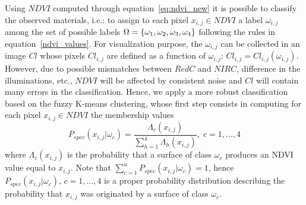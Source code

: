 \documentclass[letterpaper, 10pt, conference]{ieeeconf}      %
\begin{document}
Using $NDVI$ computed through equation~\eqref{eq:ndvi_new} it is possible to classify the observed materials, i.e.: to assign to each pixel $x_{i,j} \in NDVI$ a label $\omega_{i,j}$ among the set of possible labels $\Omega=\{\rm{\omega_1, \omega_2, \omega_3, \omega_4}\}$ following the rules in equation~\eqref{ndvi_values}.
For visualization purpose, the $\omega_{i,j}$ can be collected in an image $Cl$ whose pixels $Cl_{i,j}$ are defined as a function of $\omega_{i,j}$: $Cl_{i,j}=Cl_{i,j}(\omega_{i,j})$.
%
However, due to possible mismatches between $RedC$ and $NIRC$, difference in the illuminations, etc., $NDVI$ will be affected by consistent noise and $Cl$ will contain many errors in the classification.
Hence, we apply a more robust classification based on the fuzzy K-means clustering, whose first step consists in computing for each pixel $x_{i,j} \in NDVI$ the  membership values 
%
\begin{equation}  \label{integral}
P_{spec}(x_{i,j}|\omega_c) =  \frac{\Lambda_c(x_{i,j})}{ 	\sum_{h=1}^4 \Lambda_h(x_{i,j})}, \; c=1, \ldots, 4
\end{equation}
where $\Lambda_c(x_{i,j})$ is the probability that a surface of class $\omega_c$ produces an NDVI value equal to $x_{i,j}$.
Note that $\sum_{c=1}^n P_{spec}(x_{i,j}|\omega_c)=1$, hence $P_{spec}(x_{i,j}|\omega_c), \, c=1, \ldots, 4$ is a proper probability distribution describing the probability that $x_{i,j}$ was originated by a surface of class $\omega_c$. 
\end{document}
